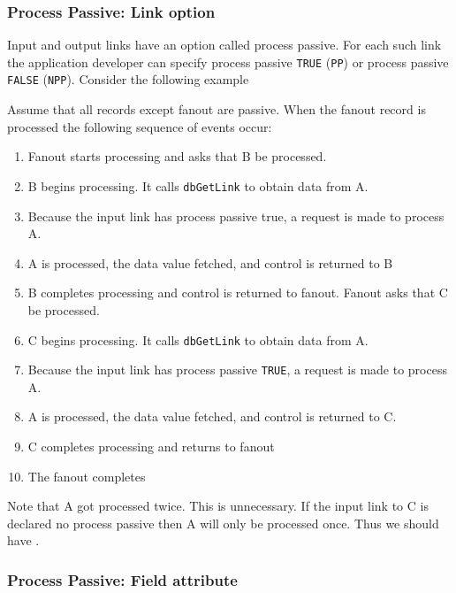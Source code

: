 \subsubsection{Process Passive: Link option}

Input and output links have an option called process passive. For each such link the application developer can specify 
process passive \verb|TRUE| (\verb|PP|) or process passive \verb|FALSE| (\verb|NPP|). Consider the following example 

Assume that all records except fanout are passive. When the fanout record is processed the following sequence of events 
occur:

\begin{enumerate}\item Fanout starts processing and asks that B be processed.

\item B begins processing. It calls \verb|dbGetLink| to obtain data from A.

\item Because the input link has process passive true, a request is made to process A.

\item A is processed, the data value fetched, and control is returned to B

\item B completes processing and control is returned to fanout. Fanout asks that C be processed.

\item C begins processing. It calls \verb|dbGetLink| to obtain data from A.

\item Because the input link has process passive \verb|TRUE|, a request is made to process A.

\item A is processed, the data value fetched, and control is returned to C.

\item C completes processing and returns to fanout

\item The fanout completes

\end{enumerate}Note that A got processed twice. This is unnecessary. If the input link to C is declared no process passive then A will only 
be processed once. Thus we should have .

\subsubsection{Process Passive: Field attribute }

